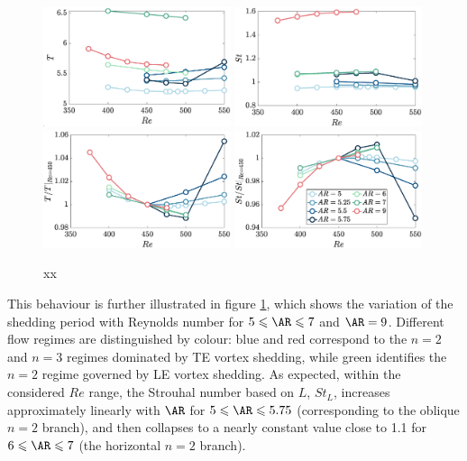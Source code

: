 \begin{figure}
  \centering
  \includegraphics[width=0.49\textwidth]{./fig/long/T_Re.eps}
  \includegraphics[width=0.49\textwidth]{./fig/long/St_Re.eps}
  \includegraphics[width=0.49\textwidth]{./fig/long/T_Re_b.eps}
  \includegraphics[width=0.49\textwidth]{./fig/long/St_Re_b.eps}
  \caption{xx}
  \label{fig:T_St_Re_long}
\end{figure}

This behaviour is further illustrated in figure \ref{fig:T_St_Re_long}, which shows the variation of the shedding period with Reynolds number for $5 \le \AR \le 7$ and $\AR = 9$. Different flow regimes are distinguished by colour: blue and red correspond to the $n = 2$ and $n = 3$ regimes dominated by TE vortex shedding, while green identifies the $n = 2$ regime governed by LE vortex shedding. As expected, within the considered $Re$ range, the Strouhal number based on $L$, $St_L$, increases approximately linearly with $\AR$ for $5 \le \AR \le 5.75$ (corresponding to the oblique $n = 2$ branch), and then collapses to a nearly constant value close to 1.1 for $6 \le \AR \le 7$ (the horizontal $n = 2$ branch).

